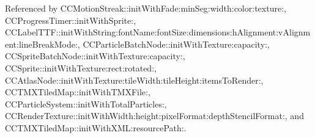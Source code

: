 Referenced by C\-C\-Motion\-Streak\-::init\-With\-Fade\-:min\-Seg\-:width\-:color\-:texture\-:, C\-C\-Progress\-Timer\-::init\-With\-Sprite\-:, C\-C\-Label\-T\-T\-F\-::init\-With\-String\-:font\-Name\-:font\-Size\-:dimensions\-:h\-Alignment\-:v\-Alignment\-:line\-Break\-Mode\-:, C\-C\-Particle\-Batch\-Node\-::init\-With\-Texture\-:capacity\-:, C\-C\-Sprite\-Batch\-Node\-::init\-With\-Texture\-:capacity\-:, C\-C\-Sprite\-::init\-With\-Texture\-:rect\-:rotated\-:, C\-C\-Atlas\-Node\-::init\-With\-Texture\-:tile\-Width\-:tile\-Height\-:items\-To\-Render\-:, C\-C\-T\-M\-X\-Tiled\-Map\-::init\-With\-T\-M\-X\-File\-:, C\-C\-Particle\-System\-::init\-With\-Total\-Particles\-:, C\-C\-Render\-Texture\-::init\-With\-Width\-:height\-:pixel\-Format\-:depth\-Stencil\-Format\-:, and C\-C\-T\-M\-X\-Tiled\-Map\-::init\-With\-X\-M\-L\-:resource\-Path\-:.


